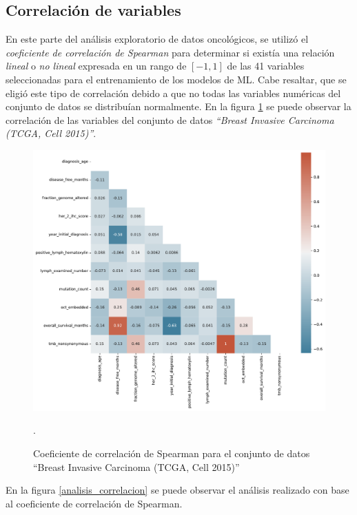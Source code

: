 \clearpage	
\newpage
\subsection{Correlación de variables}
En este parte del análisis exploratorio de datos oncológicos, se utilizó el \textit{coeficiente de correlación de Spearman} para determinar si existía una relación \textit{lineal} o \textit{no lineal} expresada en un rango de $[-1,1]$ de las 41 variables seleccionadas para el entrenamiento de los modelos de ML. Cabe resaltar, que se eligió este tipo de correlación debido a que no todas las variables numéricas del conjunto de datos se distribuían normalmente. En la figura \ref{heatmap} se puede observar la correlación de las variables del conjunto de datos \textit{“Breast Invasive Carcinoma (TCGA, Cell 2015)”}.

\begin{figure}[htb!]
	\centering
	\includegraphics[width=1
	\linewidth]{NOTEBOOK/IMAGENES_CORRELACION/correlacion_spearman}
	\caption{Coeficiente de correlación de Spearman para el conjunto de datos “Breast Invasive Carcinoma (TCGA, Cell 2015)”}.
	\label{heatmap}
\end{figure}

En la figura \ref{analisis_correlacion} se puede observar el análisis realizado con base al coeficiente de correlación de Spearman. 

